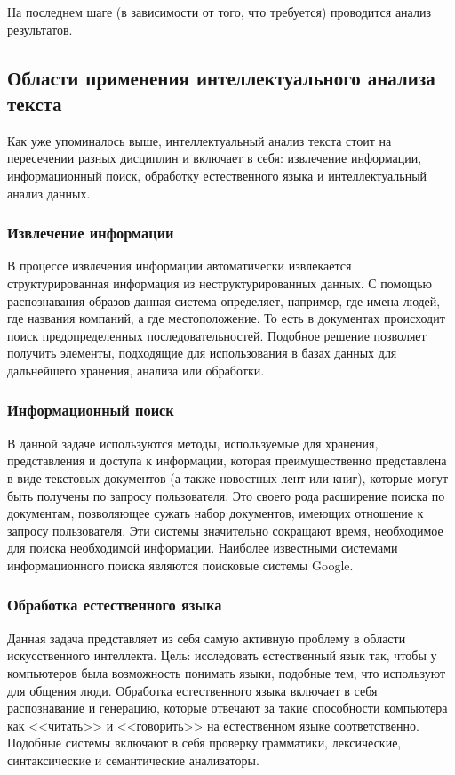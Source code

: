 \documentclass[14pt]{matmex-diploma-custom}
\begin{document}
На последнем шаге (в зависимости от того, что требуется) проводится анализ результатов.

\subsection{Области применения интеллектуального анализа текста}

Как уже упоминалось выше, интеллектуальный анализ текста стоит на пересечении разных дисциплин и включает в себя: извлечение информации, информационный поиск, обработку естественного языка и интеллектуальный анализ данных.

\subsubsection{Извлечение информации}

В процессе извлечения информации автоматически извлекается структурированная информация из неструктурированных данных. С помощью распознавания образов данная система определяет, например, где имена людей, где названия компаний, а где местоположение. То есть в документах происходит поиск предопределенных последовательностей. Подобное решение позволяет получить элементы, подходящие для использования в базах данных для дальнейшего хранения, анализа или обработки.

\subsubsection{Информационный поиск}

В данной задаче используются методы, используемые для хранения, представления и доступа к информации, которая преимущественно представлена в виде текстовых документов (а также новостных лент или книг), которые могут быть получены по запросу пользователя. Это своего рода расширение поиска по документам, позволяющее сужать набор документов, имеющих отношение к запросу пользователя. Эти системы значительно сокращают время, необходимое для поиска необходимой информации. Наиболее известными системами информационного поиска являются поисковые системы Google.

\subsubsection{Обработка естественного языка}

Данная задача представляет из себя самую активную проблему в области искусственного интеллекта. Цель: исследовать естественный язык так, чтобы у компьютеров была возможность понимать языки, подобные тем, что используют для общения люди. Обработка естественного языка включает в себя распознавание и генерацию, которые отвечают за такие способности компьютера как <<читать>> и <<говорить>> на естественном языке соответственно. Подобные системы включают в себя проверку грамматики, лексические, синтаксические и семантические анализаторы.
\end{document}
